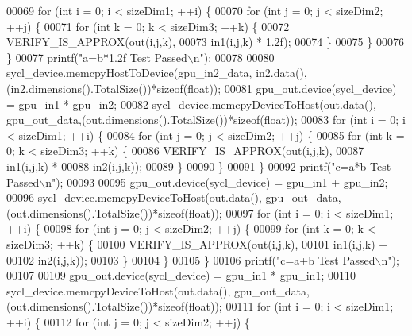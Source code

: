 \begin{DoxyCode}
00069   \textcolor{keywordflow}{for} (\textcolor{keywordtype}{int} i = 0; i < sizeDim1; ++i) \{
00070     \textcolor{keywordflow}{for} (\textcolor{keywordtype}{int} j = 0; j < sizeDim2; ++j) \{
00071       \textcolor{keywordflow}{for} (\textcolor{keywordtype}{int} k = 0; k < sizeDim3; ++k) \{
00072         VERIFY\_IS\_APPROX(out(i,j,k),
00073                          in1(i,j,k) * 1.2f);
00074       \}
00075     \}
00076   \}
00077   printf(\textcolor{stringliteral}{"a=b*1.2f Test Passed\(\backslash\)n"});
00078 
00080   sycl\_device.memcpyHostToDevice(gpu\_in2\_data, in2.data(),(in2.dimensions().TotalSize())*\textcolor{keyword}{sizeof}(\textcolor{keywordtype}{float}));
00081   gpu\_out.device(sycl\_device) = gpu\_in1 * gpu\_in2;
00082   sycl\_device.memcpyDeviceToHost(out.data(), gpu\_out\_data,(out.dimensions().TotalSize())*\textcolor{keyword}{sizeof}(\textcolor{keywordtype}{float}));
00083   \textcolor{keywordflow}{for} (\textcolor{keywordtype}{int} i = 0; i < sizeDim1; ++i) \{
00084     \textcolor{keywordflow}{for} (\textcolor{keywordtype}{int} j = 0; j < sizeDim2; ++j) \{
00085       \textcolor{keywordflow}{for} (\textcolor{keywordtype}{int} k = 0; k < sizeDim3; ++k) \{
00086         VERIFY\_IS\_APPROX(out(i,j,k),
00087                          in1(i,j,k) *
00088                              in2(i,j,k));
00089       \}
00090     \}
00091   \}
00092   printf(\textcolor{stringliteral}{"c=a*b Test Passed\(\backslash\)n"});
00093 
00095   gpu\_out.device(sycl\_device) = gpu\_in1 + gpu\_in2;
00096   sycl\_device.memcpyDeviceToHost(out.data(), gpu\_out\_data,(out.dimensions().TotalSize())*\textcolor{keyword}{sizeof}(\textcolor{keywordtype}{float}));
00097   \textcolor{keywordflow}{for} (\textcolor{keywordtype}{int} i = 0; i < sizeDim1; ++i) \{
00098     \textcolor{keywordflow}{for} (\textcolor{keywordtype}{int} j = 0; j < sizeDim2; ++j) \{
00099       \textcolor{keywordflow}{for} (\textcolor{keywordtype}{int} k = 0; k < sizeDim3; ++k) \{
00100         VERIFY\_IS\_APPROX(out(i,j,k),
00101                          in1(i,j,k) +
00102                              in2(i,j,k));
00103       \}
00104     \}
00105   \}
00106   printf(\textcolor{stringliteral}{"c=a+b Test Passed\(\backslash\)n"});
00107 
00109   gpu\_out.device(sycl\_device) = gpu\_in1 * gpu\_in1;
00110   sycl\_device.memcpyDeviceToHost(out.data(), gpu\_out\_data,(out.dimensions().TotalSize())*\textcolor{keyword}{sizeof}(\textcolor{keywordtype}{float}));
00111   \textcolor{keywordflow}{for} (\textcolor{keywordtype}{int} i = 0; i < sizeDim1; ++i) \{
00112     \textcolor{keywordflow}{for} (\textcolor{keywordtype}{int} j = 0; j < sizeDim2; ++j) \{

\end{DoxyCode}
